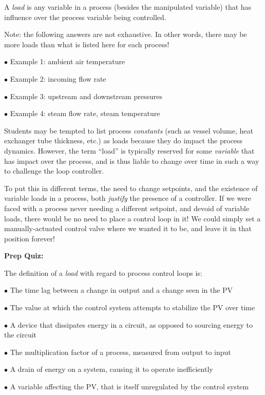 
A {\it load} is any variable in a process (besides the manipulated variable) that has influence over the process variable being controlled.

\vskip 10pt

Note: the following answers are not exhaustive.  In other words, there may be more loads than what is listed here for each process!

\medskip
\item{$\bullet$} Example 1: ambient air temperature
\item{$\bullet$} Example 2: incoming flow rate
\item{$\bullet$} Example 3: upstream and downstream pressures
\item{$\bullet$} Example 4: steam flow rate, steam temperature
\medskip







Students may be tempted to list process {\it constants} (such as vessel volume, heat exchanger tube thickness, etc.) as loads because they do impact the process dynamics.  However, the term ``load'' is typically reserved for some {\it variable} that has impact over the process, and is thus liable to change over time in such a way to challenge the loop controller.

To put this in different terms, the need to change setpoints, and the existence of variable loads in a process, both {\it justify} the presence of a controller.  If we were faced with a process never needing a different setpoint, and devoid of variable loads, there would be no need to place a control loop in it!  We could simply set a manually-actuated control valve where we wanted it to be, and leave it in that position forever!

\vfil \eject

\noindent
{\bf Prep Quiz:}

The definition of a {\it load} with regard to process control loops is:

\medskip
\item{$\bullet$} The time lag between a change in output and a change seen in the PV
\vskip 5pt 
\item{$\bullet$} The value at which the control system attempts to stabilize the PV over time
\vskip 5pt 
\item{$\bullet$} A device that dissipates energy in a circuit, as opposed to sourcing energy to the circuit
\vskip 5pt 
\item{$\bullet$} The multiplication factor of a process, measured from output to input
\vskip 5pt 
\item{$\bullet$} A drain of energy on a system, causing it to operate inefficiently
\vskip 5pt 
\item{$\bullet$} A variable affecting the PV, that is itself unregulated by the control system
\medskip






